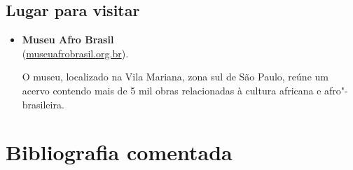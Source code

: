 \documentclass[12pt]{extarticle}
\begin{document}
\subsection{Lugar para visitar}

\begin{itemize}
\item\textbf{Museu Afro Brasil}\\
(\href{http://www.museuafrobrasil.org.br/}{museuafrobrasil.org.br}).

O museu, localizado na Vila Mariana, zona sul de São Paulo, reúne um
acervo contendo mais de 5 mil obras relacionadas à cultura africana e
afro"-brasileira.
\end{itemize}

\section{Bibliografia comentada}
\end{document}
